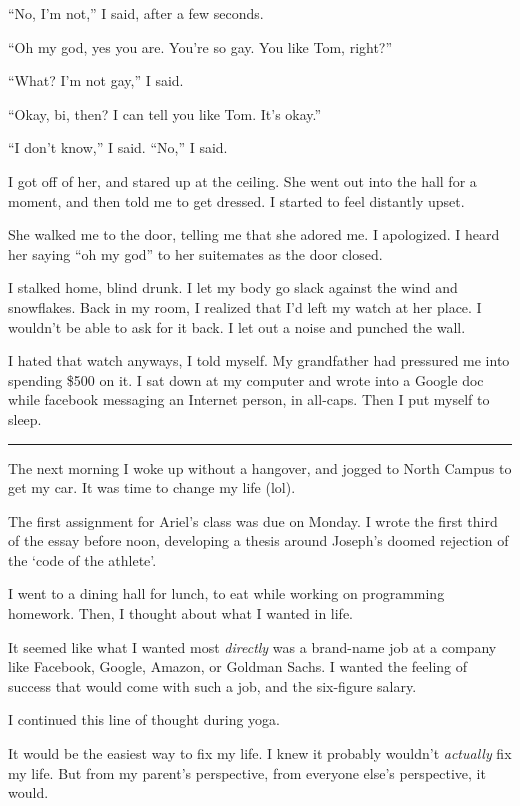 ``No, I'm not,'' I said, after a few seconds.

``Oh my god, yes you are.  You're so gay.  You like Tom, right?''

``What?  I'm not gay,'' I said.

``Okay, bi, then?  I can tell you like Tom.  It's okay.''

``I don't know,'' I said.  ``No,'' I said.

I got off of her, and stared up at the ceiling.  She went out into the hall for
a moment, and then told me to get dressed.  I started to feel distantly upset.

She walked me to the door, telling me that she adored me.  I apologized.  I
heard her saying ``oh my god'' to her suitemates as the door closed.

I stalked home, blind drunk.  I let my body go slack against the wind and
snowflakes.  Back in my room, I realized that I'd left my watch at her place.  I
wouldn't be able to ask for it back.  I let out a noise and punched the wall.

I hated that watch anyways, I told myself.  My grandfather had pressured me into
spending \$500 on it.   I sat down at my computer and wrote into a Google doc
while facebook messaging an Internet person, in all-caps.  Then I
put myself to sleep.

\plainfancybreak{12pt}{2}{}

The next morning I woke up without a hangover, and jogged to North Campus to get
my car.  It was time to change my life (lol).

The first assignment for Ariel's class was due on Monday.  I wrote the first
third of the essay before noon, developing a thesis around Joseph's doomed
rejection of the `code of the athlete'.

I went to a dining hall for lunch, to eat while working on programming homework.
Then, I thought about what I wanted in life.

It seemed like what I wanted most \textit{directly} was a brand-name job at a
company like Facebook, Google, Amazon, or Goldman Sachs.  I wanted the feeling
of success that would come with such a job, and the six-figure salary.

I continued this line of thought during yoga.

It would be the easiest way to fix my life.  I knew it probably wouldn't
\textit{actually} fix my life.  But from my parent's perspective, from everyone
else's perspective, it would.

